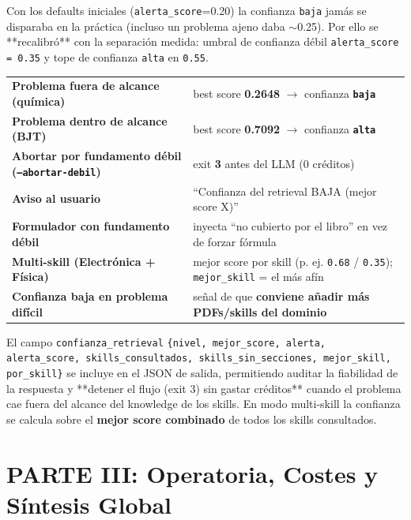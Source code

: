 \documentclass[11pt,a4paper]{article}
\begin{document}
Con los defaults iniciales (\texttt{alerta\_score}=0.20) la confianza \texttt{baja} jamás
se disparaba en la práctica (incluso un problema ajeno daba $\sim$0.25). Por ello se
**recalibró** con la separación medida: umbral de confianza débil \texttt{alerta\_score =
0.35} y tope de confianza \texttt{alta} en \texttt{0.55}.

\begin{tcolorbox}[tarjetaDato, title={\faIcon{shield-alt}~Detección de Fundamento Débil y Ampliación Multi-Skill (Medición Real, 0 créditos)}]
  \begin{tabularx}{\linewidth}{>{\bfseries\color{azulNoche}}l X}
    Problema fuera de alcance (química) & best score \textbf{0.2648} $\to$ confianza \textbf{\texttt{baja}} \\
    Problema dentro de alcance (BJT) & best score \textbf{0.7092} $\to$ confianza \textbf{\texttt{alta}} \\
    Abortar por fundamento débil (\texttt{--abortar-debil}) & exit \textbf{3} antes del LLM (0 créditos) \\
    Aviso al usuario & ``Confianza del retrieval BAJA (mejor score X)'' \\
    Formulador con fundamento débil & inyecta ``no cubierto por el libro'' en vez de forzar fórmula \\
    Multi-skill (Electrónica + Física) & mejor score por skill (p. ej. \texttt{0.68} / \texttt{0.35}); \texttt{mejor\_skill} = el más afín \\
    Confianza baja en problema difícil & señal de que \textbf{conviene añadir más PDFs/skills del dominio} \\
  \end{tabularx}
\end{tcolorbox}
El campo \texttt{confianza\_retrieval} \texttt{\{nivel, mejor\_score, alerta, alerta\_score,
skills\_consultados, skills\_sin\_secciones, mejor\_skill, por\_skill\}}
se incluye en el JSON de salida, permitiendo auditar la fiabilidad de la respuesta y
**detener el flujo (exit 3) sin gastar créditos** cuando el problema cae fuera del alcance
del knowledge de los skills. En modo multi-skill la confianza se calcula sobre el \textbf{mejor
score combinado} de todos los skills consultados.


\newpage
\part*{PARTE III: Operatoria, Costes y Síntesis Global}
\end{document}
